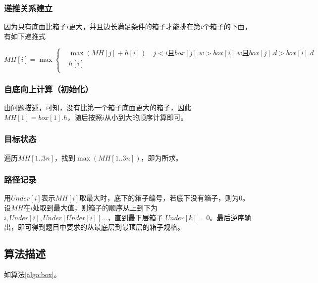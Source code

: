 \subsubsection{递推关系建立}

因为只有底面比箱子$i$更大，并且边长满足条件的箱子才能排在第$i$个箱子的下面，有如下递推式

\begin{equation}
    MH[i] =\max \left \{
        \begin{aligned}
            &\max (MH[j] + h[i]) \quad j < i \text{且} box[j].w > box[i].w \text{且} box[j].d > box[i].d \\
            &h[i]\\
        \end{aligned}
    \right .
\end{equation}

\subsubsection{自底向上计算（初始化）}

由问题描述，可知，没有比第一个箱子底面更大的箱子，因此 $MH[1] = box[1].h$，随后按照$i$从小到大的顺序计算即可。

\subsubsection{目标状态}

遍历$MH[1..3n]$，找到$\max(MH[1..3n])$，即为所求。

\subsubsection{路径记录}
用$Under[i]$表示$MH[i]$取最大时，底下的箱子编号，若底下没有箱子，则为0。设$MH$在$i$处取到最大值，则箱子的顺序从上到下为
$i, Under[i], Under[Under[i]]...$，直到最下层箱子 $Under[k] = 0$。最后逆序输出，即可得到题目中要求的从最底层到最顶层的箱子规格。

\subsection{算法描述}

如算法\ref{algo:box}。

